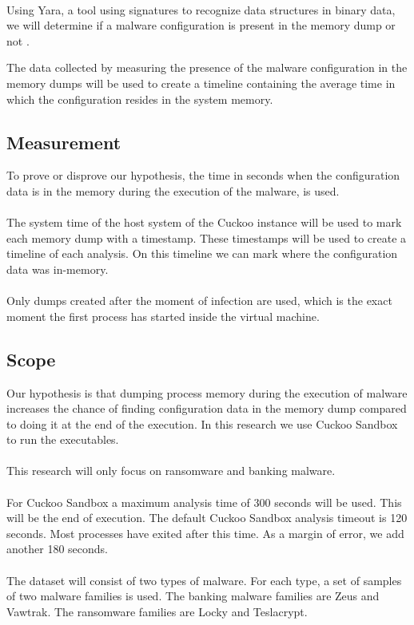 \documentclass[conference]{IEEEtran}
\begin{document}
\ \\Using Yara, a tool using signatures to recognize data structures in binary  data, we will determine if a malware configuration is present in the memory dump or not \cite{roberston-ioc}.

The data collected by measuring the presence of the malware configuration in the memory dumps will be used to create a timeline containing the average time in which the configuration resides in the system memory.


\subsection{Measurement}
To prove or disprove our hypothesis, the time in seconds when the configuration data is in the memory during the execution of the malware, is used. \\\\The system time of the host system of the Cuckoo instance will be used to mark each memory dump with a timestamp. These timestamps will be used to create a timeline of each analysis. On this timeline we can mark where the configuration data was in-memory.\\\\Only dumps created after the moment of infection are used, which is the exact moment the first process has started inside the virtual machine.


\subsection{Scope}
Our hypothesis is that dumping process memory during the execution of malware increases the chance of finding configuration data in the memory dump compared to doing it at the end of the execution. In this research we use Cuckoo Sandbox to run the executables. \\\\This research will only focus on ransomware and banking malware. \\\\For Cuckoo Sandbox a maximum analysis time of 300 seconds will be used. This will be the end of execution. The default Cuckoo Sandbox analysis timeout is 120 seconds. Most processes have exited after this time. As a margin of error, we add another 180 seconds. \\\\The dataset will consist of two types of malware. For each type, a set of samples of two malware families is used. The banking malware families are Zeus and Vawtrak. The ransomware families are Locky and Teslacrypt.
\end{document}
